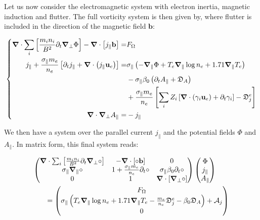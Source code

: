 Let us now consider the electromagnetic system with electron inertia, magnetic induction and flutter. The full vorticity system is then given by, where flutter is included in the direction of the magnetic field $\textbf{b}$: 

\begin{equation}
	\label{eq:S3X_vorticityEquation_FullElectromagnetic}
	\left\{
	\begin{aligned}
		\grad\cdot\sum_{i}\left[\frac{m_i n_i}{ B^2}\partial_t\grad_\perp\Phi\right] - \grad\cdot\left[j_\parallel\mathbf{b}\right]=& F_\Omega \\
		j_\parallel + \frac{\sigma_\parallel m_e}{n_e}\left[\partial_t j_\parallel + \grad\cdot\left(j_\parallel\mathbf{u}_e\right)\right] =& \sigma_\parallel \left(-\grad_\parallel\Phi + T_e\grad_\parallel\log n_e + 1.71\grad_\parallel T_e\right) \\ 
		& - \sigma_\parallel\beta_0\left(\partial_t A_\parallel + \mathfrak{D}_A \right) \\		
		& + \frac{\sigma_\parallel m_e}{n_e}\left[\sum_iZ_i\left[\grad\cdot\left(\gamma_i\mathbf{u}_e \right) + \partial_t \gamma_i\right] - \mathfrak{D}_j^e\right] \\
		\hspace{3cm}\grad\cdot\grad_\perp A_\parallel =& -j_\parallel
	\end{aligned}
	\right.
\end{equation}

We then have a system over the parallel current $j_\parallel$ and the potential fields $\Phi$ and $A_\parallel$. In matrix form, this final system reads:

\begin{align}
	\makebox[0.8\textwidth][l]{$\displaystyle
		\begin{pmatrix}
			\grad\cdot\sum_{i}\left[\frac{m_i n_i}{ B^2}\partial_t\grad_\perp\circ\right] & 
			- \grad\cdot\left[\circ\mathbf{b}\right] & 
			0 \\
			\sigma_\parallel\grad_\parallel\circ &
			1 + \frac{\sigma_\parallel m_e}{n_e}\partial_t \circ &
			\sigma_\parallel\beta_0\partial_t\circ \\
			0 & 1 & \grad\cdot\left[\grad_\perp\circ\right]
		\end{pmatrix}
		\begin{pmatrix}
			\Phi \\ j_\parallel \\ A_\parallel
		\end{pmatrix}
		$} \nonumber \\	
	\makebox[0.8\textwidth][r]{$\displaystyle
		= \begin{pmatrix}
			F_\Omega \\
			\sigma_\parallel\left(T_e\grad_\parallel\log n_e + 1.71\grad_\parallel T_e - \frac{m_e}{n_e}\mathfrak{D}_j^e - \beta_0\mathfrak{D}_A \right) + \mathcal{A}_j \\
			0
		\end{pmatrix}
		$} \label{eq:S3X_vorticityEquation_ElectronInertiaElectromagnetism_matrix}
\end{align}

